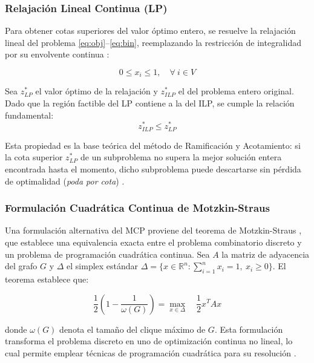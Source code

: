 \subsubsection{Relajación Lineal Continua (LP)}

Para obtener cotas superiores del valor óptimo entero, se resuelve la relajación lineal del problema \eqref{eq:obj}--\eqref{eq:bin}, reemplazando la restricción de integralidad por su envolvente continua \cite{nemhauser1988, schrijver1986}:

\begin{equation}\label{eq:relax}
    0 \leq x_i \leq 1, \quad \forall\ i \in V
\end{equation}

Sea $z^*_{LP}$ el valor óptimo de la relajación y $z^*_{ILP}$ el del problema entero original. Dado que la región factible del LP contiene a la del ILP, se cumple la relación fundamental:
\begin{equation}\label{eq:cota}
    z^*_{ILP} \leq z^*_{LP}
\end{equation}

Esta propiedad es la base teórica del método de Ramificación y Acotamiento: si la cota superior $z^*_{LP}$ de un subproblema no supera la mejor solución entera encontrada hasta el momento, dicho subproblema puede descartarse sin pérdida de optimalidad (\textit{poda por cota}) \cite{nemhauser1988, wolsey1998}.

\subsubsection{Formulación Cuadrática Continua de Motzkin-Straus}

Una formulación alternativa del MCP proviene del teorema de Motzkin-Straus \cite{motzkin1965}, que establece una equivalencia exacta entre el problema combinatorio discreto y un problema de programación cuadrática continua. Sea $A$ la matriz de adyacencia del grafo $G$ y $\Delta$ el simplex estándar $\Delta = \{x \in \mathbb{R}^n : \sum_{i=1}^{n} x_i = 1,\ x_i \geq 0\}$. El teorema establece que:

\begin{equation}\label{eq:motzkin}
    \frac{1}{2}\left(1 - \frac{1}{\omega(G)}\right) = \max_{x \in \Delta} \quad \frac{1}{2} x^T A x
\end{equation}

\noindent donde $\omega(G)$ denota el tamaño del clique máximo de $G$. Esta formulación transforma el problema discreto en uno de optimización continua no lineal, lo cual permite emplear técnicas de programación cuadrática para su resolución \cite{pardalos1992_maxclique, bomze1999}.

